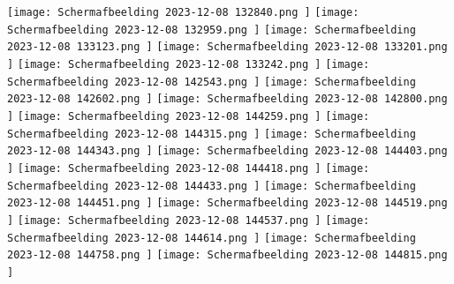 \documentclass{article}
\begin{document}
	\texttt{[image: Schermafbeelding 2023-12-08 132840.png ]} 
	\newline\newline
	\texttt{[image: Schermafbeelding 2023-12-08 132959.png ]}
	\newline
	\texttt{[image: Schermafbeelding 2023-12-08 133123.png ]} 
	\newline
	\texttt{[image: Schermafbeelding 2023-12-08 133201.png ]} 
	\newline
	\texttt{[image: Schermafbeelding 2023-12-08 133242.png ]} 
	\newline
	\texttt{[image: Schermafbeelding 2023-12-08 142543.png ]}
	\newline
	\texttt{[image: Schermafbeelding 2023-12-08 142602.png ]}
	\newline
	\texttt{[image: Schermafbeelding 2023-12-08 142800.png ]}
	\newline
	\texttt{[image: Schermafbeelding 2023-12-08 144259.png ]}
	\newline
	\texttt{[image: Schermafbeelding 2023-12-08 144315.png ]} 
	\newline
	\texttt{[image: Schermafbeelding 2023-12-08 144343.png ]} 
	\newline
	\texttt{[image: Schermafbeelding 2023-12-08 144403.png ]}
	\newline
	\texttt{[image: Schermafbeelding 2023-12-08 144418.png ]}
	\newline
	\texttt{[image: Schermafbeelding 2023-12-08 144433.png ]} 
	\newline
	\texttt{[image: Schermafbeelding 2023-12-08 144451.png ]} 
	\newline
	\texttt{[image: Schermafbeelding 2023-12-08 144519.png ]} 
	\newline
	\texttt{[image: Schermafbeelding 2023-12-08 144537.png ]}
	\newline
	\texttt{[image: Schermafbeelding 2023-12-08 144614.png ]}
	\newline
	\texttt{[image: Schermafbeelding 2023-12-08 144758.png ]} 
	\newline
	\texttt{[image: Schermafbeelding 2023-12-08 144815.png ]} 
	
	
	
	
	
	
	\newpage
	
	
	
\end{document}

